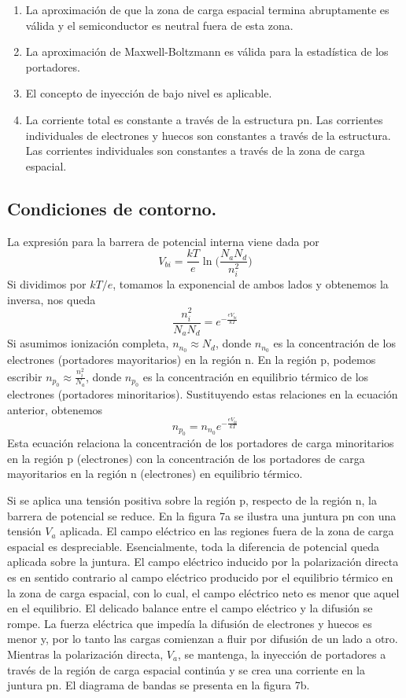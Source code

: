 \documentclass[12pt,a4paper]{article}
\begin{document}
\begin{enumerate}
\item La aproximación de que la zona de carga espacial termina abruptamente es válida y el semiconductor es neutral fuera de esta zona.
\item La aproximación de Maxwell-Boltzmann es válida para la estadística de los portadores.
\item El concepto de inyección de bajo nivel es aplicable.
\item La corriente total es constante a través de la estructura pn. Las corrientes individuales de electrones y huecos son constantes a través de la estructura. Las corrientes individuales son constantes a través de la zona de carga espacial.
\end{enumerate}

\subsection{Condiciones de contorno.}

La expresión para la barrera de potencial interna viene dada por
\[ V_{bi} = \frac{kT}{e} \ln \bigg( \frac{N_{a}N_{d}}{n_{i}^{2}} \bigg) \]
Si dividimos por $kT/e$, tomamos la exponencial de ambos lados y obtenemos la inversa, nos queda
\[ \frac{n_{i}^{2}}{N_{a}N_{d}}=e^{-\frac{eV_{bi}}{kT}} \]
Si asumimos ionización completa, $n_{n_{0}} \approx N_{d}$, donde $n_{n_{0}}$ es la concentración de los electrones (portadores mayoritarios) en la región n. En la región p, podemos escribir $n_{p_{0}} \approx \frac{n_{i}^{2}}{N_{a}}$, donde $n_{p_{0}}$ es la concentración en equilibrio térmico de los electrones (portadores minoritarios). Sustituyendo estas relaciones en la ecuación anterior, obtenemos
\[ n_{p_{0}}=n_{n_{0}} e^{-\frac{eV_{bi}}{kT}} \]
Esta ecuación relaciona la concentración de los portadores de carga minoritarios en la región p (electrones) con la concentración de los portadores de carga mayoritarios en la región n (electrones) en equilibrio térmico.

Si se aplica una tensión positiva sobre la región p, respecto de la región n, la barrera de potencial se reduce. En la figura 7a se ilustra una juntura pn con una tensión $V_{a}$ aplicada. El campo eléctrico en las regiones fuera de la zona de carga espacial es despreciable. Esencialmente, toda la diferencia de potencial queda aplicada sobre la juntura. El campo eléctrico inducido por la polarización directa es en sentido contrario al campo eléctrico producido por el equilibrio térmico en la zona de carga espacial, con lo cual, el campo eléctrico neto es menor que aquel en el equilibrio. El delicado balance entre el campo eléctrico y la difusión se rompe. La fuerza eléctrica que impedía la difusión de electrones y huecos es menor y, por lo tanto las cargas comienzan a fluir por difusión de un lado a otro. Mientras la polarización directa, $V_{a}$, se mantenga, la inyección de portadores a través de la región de carga espacial continúa y se crea una corriente en la juntura pn. El diagrama de bandas se presenta en la figura 7b.
\end{document}
